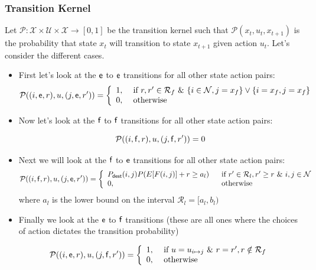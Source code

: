 \documentclass{article}
\newcommand{\mc}{\mathcal}
\newcommand{\rar}{\rightarrow}
\newcommand{\sn}[1]{{\sf{#1}}}
\newcommand{\e}{{\sf e}}
\newcommand{\f}{{\sf f}}
\newcommand{\Pdest}{P_{\text{\sn{dest}}}}
\begin{document}
\subsubsection{Transition Kernel}
Let $\mc{P}: \mc{X}\times \mc{U}\times\mc{X}\rar [0,1]$ be the transition kernel such that $\mc{P}(x_{t},u_t, x_{t+1})$ is the probability that state $x_t$ will transition to state $x_{t+1}$ given action $u_t$. Let's consider the different cases. 
\begin{itemize}
\item First let's look at the $\e$ to $\e$ transitions for all other state action pairs:
\[\mc{P}( (i,\e,r),u,(j,\e,r'))=\left\{\begin{array}{ll} 1, & \ \text{if}\ r,r'\in \mc{R}_f\ \text{\&}\ \{i\in \mc{N},j=x_f\}\vee\{i=x_f,j=x_f\}\\
0, & \ \text{otherwise}\end{array}\right.\]

\item Now let's look at the $\f$ to $\f$ transitions for all other state action pairs:

\[\mc{P}( (i,\f,r),u,(j,\f,r'))=0\]
\item Next we will look at the $\f$ to $\e$ transitions for all other state action pairs:
\[\mc{P}((i,\f,r),u,(j,\e,r'))=\left\{\begin{array}{ll}
\Pdest(i,j)P(E[F(i,j)]+r\geq a_l)\ & \ \text{if}\ r'\in \mc{R}_l, r'\geq r\ \text{\&}\ i,j\in \mc{N}\\ 0, & \ \text{otherwise} \end{array}\right.\]
where $a_l$ is the lower bound on the interval
$\mc{R}_l=[a_l,b_l)$
\item Finally we look at the $\e$ to $\f$ transitions (these are all ones where the choices of action dictates the transition probability)

\[\mc{P}( (i,\e,r),u,(j,\f,r'))=\left\{\begin{array}{ll} 1, & \ \text{if}\ u=u_{i\mapsto j}\ \text{\&}\ r=r', r\notin \mc{R}_f\\
0, & \ \text{otherwise}\end{array}\right.\]
\end{itemize}
\end{document}
